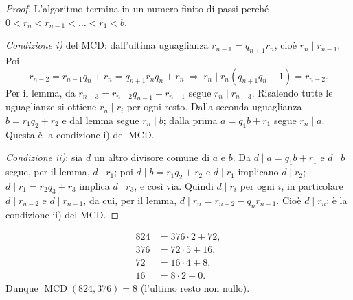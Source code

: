 \documentclass[11pt,a4paper]{article}
\begin{document}
\begin{proof}
L'algoritmo termina in un numero finito di passi perché $0 < r_n < r_{n-1} < \dots < r_1 < b$.

\emph{Condizione i)} del MCD: dall'ultima uguaglianza $r_{n-1} = q_{n+1} r_n$, cioè $r_n \mid r_{n-1}$. Poi
\[
  r_{n-2} = r_{n-1} q_n + r_n = q_{n+1} r_n q_n + r_n \ \Rightarrow\ r_n \mid r_n(q_{n+1} q_n + 1) = r_{n-2}.
\]
Per il lemma, da $r_{n-3} = r_{n-2} q_{n-1} + r_{n-1}$ segue $r_n \mid r_{n-3}$. Risalendo tutte le uguaglianze si ottiene $r_n \mid r_i$ per ogni resto. Dalla seconda uguaglianza $b = r_1 q_2 + r_2$ e dal lemma segue $r_n \mid b$; dalla prima $a = q_1 b + r_1$ segue $r_n \mid a$. Questa è la condizione i) del MCD.

\emph{Condizione ii)}: sia $d$ un altro divisore comune di $a$ e $b$. Da $d \mid a = q_1 b + r_1$ e $d \mid b$ segue, per il lemma, $d \mid r_1$; poi $d \mid b = r_1 q_2 + r_2$ e $d \mid r_1$ implicano $d \mid r_2$; $d \mid r_1 = r_2 q_3 + r_3$ implica $d \mid r_3$, e così via. Quindi $d \mid r_i$ per ogni $i$, in particolare $d \mid r_{n-2}$ e $d \mid r_{n-1}$, da cui, per il lemma, $d \mid r_n = r_{n-2} - q_n r_{n-1}$. Cioè $d \mid r_n$: è la condizione ii) del MCD.
\end{proof}

\begin{esempio}
\begin{align*}
  824 &= 376\cdot 2 + 72,\\
  376 &= 72\cdot 5 + 16,\\
  72 &= 16\cdot 4 + 8,\\
  16 &= 8\cdot 2 + 0 .
\end{align*}
Dunque $\operatorname{MCD}(824, 376) = 8$ (l'ultimo resto non nullo).
\end{esempio}
\end{document}
